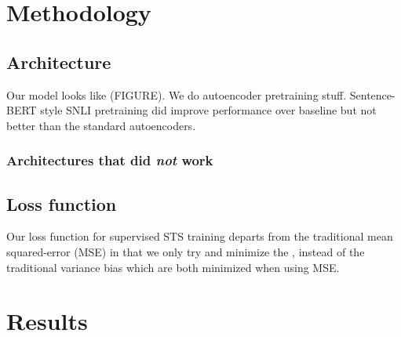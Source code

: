\documentclass[14pt]{article}
\begin{document}

\section{Methodology}
\subsection{Architecture}
Our model looks like (FIGURE). We do autoencoder pretraining stuff. Sentence-BERT style SNLI pretraining did improve performance over baseline but not better than the standard autoencoders.

\subsubsection{Architectures that did \textit{not} work}


\subsection{Loss function}
Our loss function for supervised STS training departs from the traditional mean squared-error (MSE) in that we only try and minimize the , instead of the traditional variance  bias which are both minimized when using MSE.

\section{Results}
\end{document}
